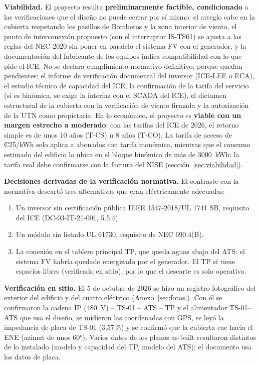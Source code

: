 \documentclass[12pt]{article}
\begin{document}
\textbf{Viabilidad.} El proyecto resulta \textbf{preliminarmente factible, condicionado} a las verificaciones que el diseño no puede cerrar por sí mismo: el arreglo cabe en la cubierta respetando los pasillos de Bomberos y la zona interior de viento, el punto de interconexión propuesto (con el interruptor IS-TS01) se ajusta a las reglas del NEC 2020 sin poner en paralelo el sistema FV con el generador, y la documentación del fabricante de los equipos indica compatibilidad con lo que pide el ICE. No se declara cumplimiento normativo definitivo, porque quedan pendientes: el informe de verificación documental del inversor (ICE-LEE o ECA), el estudio técnico de capacidad del ICE, la confirmación de la tarifa del servicio (si es binómica, se exige la interfaz con el SCADA del ICE), el dictamen estructural de la cubierta con la verificación de viento firmada y la autorización de la UTN como propietaria. En lo económico, el proyecto es \textbf{viable con un margen estrecho a moderado}: con las tarifas del ICE de 2026, el retorno simple es de unos 10 años (T-CS) u 8 años (T-CO). La tarifa de acceso de ₡25/kWh solo aplica a abonados con tarifa monómica, mientras que el consumo estimado del edificio lo ubica en el bloque binómico de más de 3000~kWh; la tarifa real debe confirmarse con la factura del NISE (sección~\ref{sec:viabilidad}).

\textbf{Decisiones derivadas de la verificación normativa.} El contraste con la normativa descartó tres alternativas que eran eléctricamente adecuadas:
\begin{enumerate}[label=(\roman*)]
\item Un inversor sin certificación pública IEEE 1547-2018/UL 1741 SB, requisito del ICE (DC-03-IT-21-001, 5.5.4).
\item Un módulo sin listado UL 61730, requisito de NEC 690.4(B).
\item La conexión en el tablero principal TP, que queda aguas abajo del ATS: el sistema FV habría quedado energizado por el generador. El TP sí tiene espacios libres (verificado en sitio), por lo que el descarte es solo operativo.
\end{enumerate}

\textbf{Verificación en sitio.} El 5 de octubre de 2026 se hizo un registro fotográfico del exterior del edificio y del cuarto eléctrico (Anexo~\ref{sec:fotos}). Con él se confirmaron la cadena IP (480~V) -- TS-01 -- ATS -- TP y el alimentador TS-01--ATS que usa el diseño, se midieron las coordenadas con GPS, se leyó la impedancia de placa de TS-01 (3,57\,\%) y se confirmó que la cubierta cae hacia el ENE (azimut de unos 60°). Varios datos de los planos as-built resultaron distintos de lo instalado (modelo y capacidad del TP, modelo del ATS); el documento usa los datos de placa.
\end{document}

